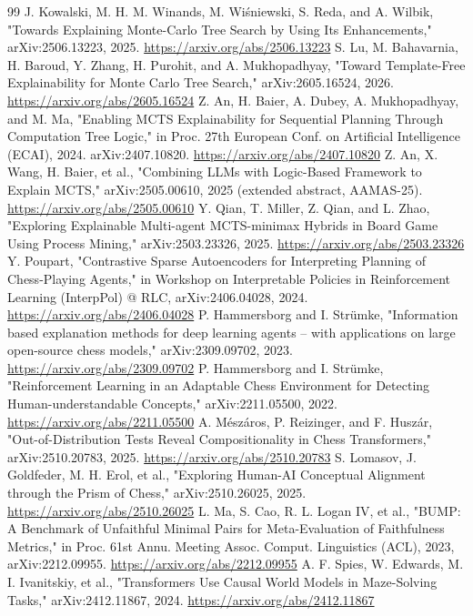 \documentclass[conference]{IEEEtran}
\begin{document}
\begin{thebibliography}{99}
 J. Kowalski, M. H. M. Winands, M. Wiśniewski, S. Reda, and A. Wilbik, "Towards Explaining Monte-Carlo Tree Search by Using Its Enhancements," arXiv:2506.13223, 2025. \url{https://arxiv.org/abs/2506.13223}
 S. Lu, M. Bahavarnia, H. Baroud, Y. Zhang, H. Purohit, and A. Mukhopadhyay, "Toward Template-Free Explainability for Monte Carlo Tree Search," arXiv:2605.16524, 2026. \url{https://arxiv.org/abs/2605.16524}
 Z. An, H. Baier, A. Dubey, A. Mukhopadhyay, and M. Ma, "Enabling MCTS Explainability for Sequential Planning Through Computation Tree Logic," in Proc. 27th European Conf. on Artificial Intelligence (ECAI), 2024. arXiv:2407.10820. \url{https://arxiv.org/abs/2407.10820}
 Z. An, X. Wang, H. Baier, et al., "Combining LLMs with Logic-Based Framework to Explain MCTS," arXiv:2505.00610, 2025 (extended abstract, AAMAS-25). \url{https://arxiv.org/abs/2505.00610}
 Y. Qian, T. Miller, Z. Qian, and L. Zhao, "Exploring Explainable Multi-agent MCTS-minimax Hybrids in Board Game Using Process Mining," arXiv:2503.23326, 2025. \url{https://arxiv.org/abs/2503.23326}
 Y. Poupart, "Contrastive Sparse Autoencoders for Interpreting Planning of Chess-Playing Agents," in Workshop on Interpretable Policies in Reinforcement Learning (InterpPol) @ RLC, arXiv:2406.04028, 2024. \url{https://arxiv.org/abs/2406.04028}
 P. Hammersborg and I. Strümke, "Information based explanation methods for deep learning agents -- with applications on large open-source chess models," arXiv:2309.09702, 2023. \url{https://arxiv.org/abs/2309.09702}
 P. Hammersborg and I. Strümke, "Reinforcement Learning in an Adaptable Chess Environment for Detecting Human-understandable Concepts," arXiv:2211.05500, 2022. \url{https://arxiv.org/abs/2211.05500}
 A. Mészáros, P. Reizinger, and F. Huszár, "Out-of-Distribution Tests Reveal Compositionality in Chess Transformers," arXiv:2510.20783, 2025. \url{https://arxiv.org/abs/2510.20783}
 S. Lomasov, J. Goldfeder, M. H. Erol, et al., "Exploring Human-AI Conceptual Alignment through the Prism of Chess," arXiv:2510.26025, 2025. \url{https://arxiv.org/abs/2510.26025}
 L. Ma, S. Cao, R. L. Logan IV, et al., "BUMP: A Benchmark of Unfaithful Minimal Pairs for Meta-Evaluation of Faithfulness Metrics," in Proc. 61st Annu. Meeting Assoc. Comput. Linguistics (ACL), 2023, arXiv:2212.09955. \url{https://arxiv.org/abs/2212.09955}
 A. F. Spies, W. Edwards, M. I. Ivanitskiy, et al., "Transformers Use Causal World Models in Maze-Solving Tasks," arXiv:2412.11867, 2024. \url{https://arxiv.org/abs/2412.11867}

\end{thebibliography}
\end{document}
